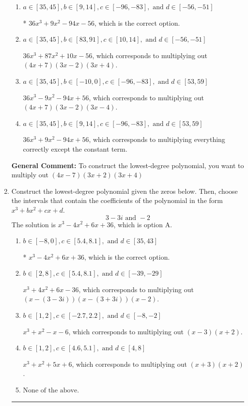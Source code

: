 \documentclass{extbook}[14pt]
\newcommand{\litem}[1]{\item #1

\rule{\textwidth}{0.4pt}}
\begin{document}
\begin{enumerate}
{\begin{enumerate}[label=\Alph*.]
$36x^{3} +135 x^{2} +158 x + 56$, which corresponds to multiplying out $(4x + 7)(3x + 2)(3x + 4)$.
\item \( a \in [35, 45], b \in [9, 14], c \in [-96, -83], \text{ and } d \in [-56, -51] \)

* $36x^{3} +9 x^{2} -94 x -56$, which is the correct option.
\item \( a \in [35, 45], b \in [83, 91], c \in [10, 14], \text{ and } d \in [-56, -51] \)

$36x^{3} +87 x^{2} +10 x -56$, which corresponds to multiplying out $(4x + 7)(3x -2)(3x + 4)$.
\item \( a \in [35, 45], b \in [-10, 0], c \in [-96, -83], \text{ and } d \in [53, 59] \)

$36x^{3} -9 x^{2} -94 x + 56$, which corresponds to multiplying out $(4x + 7)(3x -2)(3x -4)$.
\item \( a \in [35, 45], b \in [9, 14], c \in [-96, -83], \text{ and } d \in [53, 59] \)

$36x^{3} +9 x^{2} -94 x + 56$, which corresponds to multiplying everything correctly except the constant term.
\end{enumerate}

\textbf{General Comment:} To construct the lowest-degree polynomial, you want to multiply out $(4x -7)(3x + 2)(3x + 4)$
}
\litem{
Construct the lowest-degree polynomial given the zeros below. Then, choose the intervals that contain the coefficients of the polynomial in the form $x^3+bx^2+cx+d$.
\[ 3 - 3 i \text{ and } -2 \]The solution is \( x^{3} -4 x^{2} +6 x + 36 \), which is option A.\begin{enumerate}[label=\Alph*.]
\item \( b \in [-8, 0], c \in [5.4, 8.1], \text{ and } d \in [35, 43] \)

* $x^{3} -4 x^{2} +6 x + 36$, which is the correct option.
\item \( b \in [2, 8], c \in [5.4, 8.1], \text{ and } d \in [-39, -29] \)

$x^{3} +4 x^{2} +6 x -36$, which corresponds to multiplying out $(x-(3 - 3 i))(x-(3 + 3 i))(x -2)$.
\item \( b \in [1, 2], c \in [-2.7, 2.2], \text{ and } d \in [-8, -2] \)

$x^{3} + x^{2} -x -6$, which corresponds to multiplying out $(x -3)(x + 2)$.
\item \( b \in [1, 2], c \in [4.6, 5.1], \text{ and } d \in [4, 8] \)

$x^{3} + x^{2} +5 x + 6$, which corresponds to multiplying out $(x + 3)(x + 2)$.
\item \( \text{None of the above.} \)


\end{enumerate}}
\end{enumerate}
\end{document}
